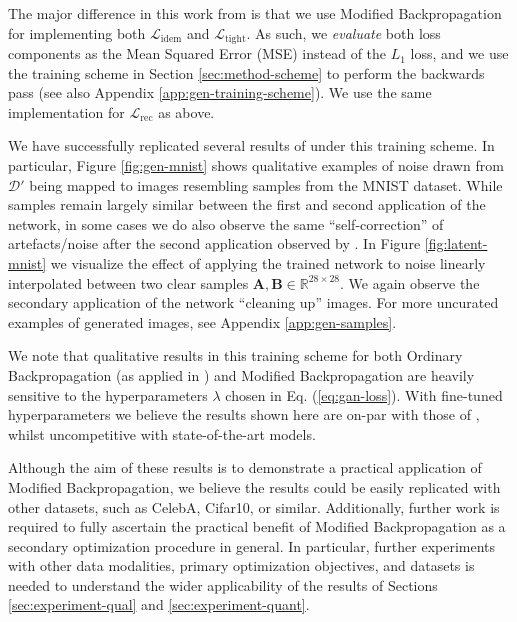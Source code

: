\documentclass{article}
\theoremstyle{plain}
\theoremstyle{definition}
\theoremstyle{remark}
\newcommand{\vA}{\mathbf{A}}
\newcommand{\vB}{\mathbf{B}}
\begin{document}
The major difference in this work from \citealt{shocher-ign} is that we use Modified Backpropagation for implementing both $\mathcal{L}_{\mathrm{idem}}$ and $\mathcal{L}_{\mathrm{tight}}$. As such, we \textit{evaluate} both loss components as the Mean Squared Error (MSE) instead of the $L_1$ loss, and we use the training scheme in Section \ref{sec:method-scheme} to perform the backwards pass (see also Appendix \ref{app:gen-training-scheme}). We use the same implementation for $\mathcal{L}_{\mathrm{rec}}$ as above.

We have successfully replicated several results of \citealt{shocher-ign} under this training scheme. In particular, Figure \ref{fig:gen-mnist} shows qualitative examples of noise drawn from $\mathcal{D}'$ being mapped to images resembling samples from the MNIST dataset. While samples remain largely similar between the first and second application of the network, in some cases we do also observe the same ``self-correction'' of artefacts/noise after the second application observed by \citealt{shocher-ign}. In Figure \ref{fig:latent-mnist} we visualize the effect of applying the trained network to noise linearly interpolated between two clear samples $\vA, \vB \in \mathbb{R}^{28 \times 28}$. We again observe the secondary application of the network ``cleaning up'' images. For more uncurated examples of generated images, see Appendix \ref{app:gen-samples}.

We note that qualitative results in this training scheme for both Ordinary Backpropagation (as applied in \citealt{shocher-ign}) and Modified Backpropagation are heavily sensitive to the hyperparameters $\lambda$ chosen in Eq. (\ref{eq:gan-loss}). With fine-tuned hyperparameters we believe the results shown here are on-par with those of \citealt{shocher-ign}, whilst uncompetitive with state-of-the-art models.


Although the aim of these results is to demonstrate a practical application of Modified Backpropagation, we believe the results could be easily replicated with other datasets, such as CelebA, Cifar10, or similar. Additionally, further work is required to fully ascertain the practical benefit of Modified Backpropagation as a secondary optimization procedure in general. In particular, further experiments with other data modalities, primary optimization objectives, and datasets is needed to understand the wider applicability of the results of Sections \ref{sec:experiment-qual} and \ref{sec:experiment-quant}.
\end{document}
